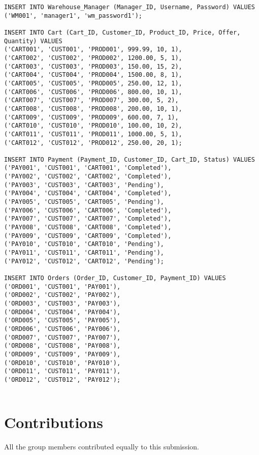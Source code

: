 \documentclass[12pt]{article}
\begin{document}
\begin{verbatim}
INSERT INTO Warehouse_Manager (Manager_ID, Username, Password) VALUES
('WM001', 'manager1', 'wm_password1');

INSERT INTO Cart (Cart_ID, Customer_ID, Product_ID, Price, Offer, Quantity) VALUES
('CART001', 'CUST001', 'PROD001', 999.99, 10, 1),
('CART002', 'CUST002', 'PROD002', 1200.00, 5, 1),
('CART003', 'CUST003', 'PROD003', 150.00, 15, 2),
('CART004', 'CUST004', 'PROD004', 1500.00, 8, 1),
('CART005', 'CUST005', 'PROD005', 250.00, 12, 1),
('CART006', 'CUST006', 'PROD006', 800.00, 10, 1),
('CART007', 'CUST007', 'PROD007', 300.00, 5, 2),
('CART008', 'CUST008', 'PROD008', 200.00, 10, 1),
('CART009', 'CUST009', 'PROD009', 600.00, 7, 1),
('CART010', 'CUST010', 'PROD010', 100.00, 10, 2),
('CART011', 'CUST011', 'PROD011', 1000.00, 5, 1),
('CART012', 'CUST012', 'PROD012', 250.00, 20, 1);

INSERT INTO Payment (Payment_ID, Customer_ID, Cart_ID, Status) VALUES
('PAY001', 'CUST001', 'CART001', 'Completed'),
('PAY002', 'CUST002', 'CART002', 'Completed'),
('PAY003', 'CUST003', 'CART003', 'Pending'),
('PAY004', 'CUST004', 'CART004', 'Completed'),
('PAY005', 'CUST005', 'CART005', 'Pending'),
('PAY006', 'CUST006', 'CART006', 'Completed'),
('PAY007', 'CUST007', 'CART007', 'Completed'),
('PAY008', 'CUST008', 'CART008', 'Completed'),
('PAY009', 'CUST009', 'CART009', 'Completed'),
('PAY010', 'CUST010', 'CART010', 'Pending'),
('PAY011', 'CUST011', 'CART011', 'Pending'),
('PAY012', 'CUST012', 'CART012', 'Pending');

INSERT INTO Orders (Order_ID, Customer_ID, Payment_ID) VALUES
('ORD001', 'CUST001', 'PAY001'),
('ORD002', 'CUST002', 'PAY002'),
('ORD003', 'CUST003', 'PAY003'),
('ORD004', 'CUST004', 'PAY004'),
('ORD005', 'CUST005', 'PAY005'),
('ORD006', 'CUST006', 'PAY006'),
('ORD007', 'CUST007', 'PAY007'),
('ORD008', 'CUST008', 'PAY008'),
('ORD009', 'CUST009', 'PAY009'),
('ORD010', 'CUST010', 'PAY010'),
('ORD011', 'CUST011', 'PAY011'),
('ORD012', 'CUST012', 'PAY012');


\end{verbatim}

\section*{Contributions}
All the group members contributed equally to this submission.
\end{document}
